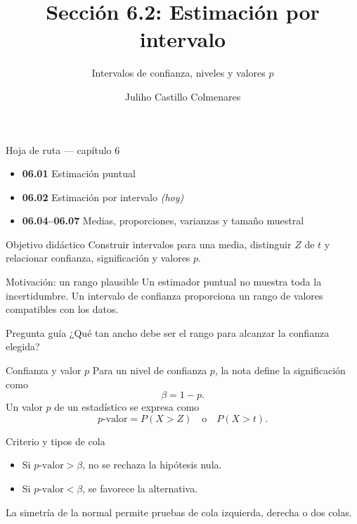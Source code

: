 \documentclass[10pt,aspectratio=169]{beamer}
\title[Estimación por intervalo]{Sección 6.2: Estimación por intervalo}
\subtitle{Intervalos de confianza, niveles y valores $p$}
\author[J. Castillo Colmenares]{Juliho Castillo Colmenares}
\institute{Tecnológico de Monterrey}
\date{}
\begin{document}
\begin{frame}[plain]\vspace{-0.8cm}\titlepage\end{frame}

\begin{frame}{Hoja de ruta --- capítulo 6}
  \footnotesize
  \begin{itemize}\itemsep=0.08cm
    \item \textbf{06.01} Estimación puntual
    \item \textbf{06.02} Estimación por intervalo \emph{(hoy)}
    \item \textbf{06.04--06.07} Medias, proporciones, varianzas y tamaño muestral
  \end{itemize}
  \begin{block}{Objetivo didáctico}
    Construir intervalos para una media, distinguir $Z$ de $t$ y relacionar
    confianza, significación y valores $p$.
  \end{block}
\end{frame}

\begin{frame}{Motivación: un rango plausible}
  \footnotesize
  Un estimador puntual no muestra toda la incertidumbre. Un intervalo de
  confianza proporciona un rango de valores compatibles con los datos.
  \begin{alertblock}{Pregunta guía}
    ¿Qué tan ancho debe ser el rango para alcanzar la confianza elegida?
  \end{alertblock}
\end{frame}

\begin{frame}{Confianza y valor $p$}
  \footnotesize
  Para un nivel de confianza $p$, la nota define la significación como
  \[
    \beta=1-p.
  \]
  Un valor $p$ de un estadístico se expresa como
  \[
    p\text{-valor}=P(X>Z)\quad\text{o}\quad P(X>t).
  \]
\end{frame}

\begin{frame}{Criterio y tipos de cola}
  \footnotesize
  \begin{itemize}\itemsep=0.12cm
    \item Si $p\text{-valor}>\beta$, no se rechaza la hipótesis nula.
    \item Si $p\text{-valor}<\beta$, se favorece la alternativa.
  \end{itemize}
  La simetría de la normal permite pruebas de cola izquierda, derecha o dos
  colas.
\end{frame}
\end{document}
